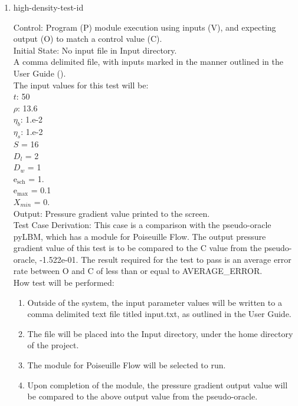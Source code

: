 \documentclass[12pt, titlepage]{article}
\newcounter{testcounter} %
\begin{document}
\begin{enumerate}
\item{high-density-test-id\thetestcounter \\}

Control: Program (P) module execution using inputs (V), and expecting output (O)
to match a control value (C).\\
					
Initial State: No input file in Input directory.\\
					
A comma delimited file, with inputs marked in the manner outlined in the User
Guide (\citet{LBM_UserGuide_PM}).\\The input values for this test will be:\\
$t$: 50\\
$\rho$: 13.6\\
$\eta_b$: 1.e-2\\
$\eta_s$: 1.e-2\\
$S$ = 16\\
$D_{l}$ = 2\\
$D_{w}$ = 1\\
$\mathrm{e_{sch}}$ = 1.\\
$\mathrm{e_{max}}$ = 0.1\\
$X_{min}$ = 0.\\

Output: Pressure gradient value printed to the screen.  \\

Test Case Derivation: This case is a comparison with the pseudo-oracle pyLBM,
which has a module for Poiseuille Flow. The output pressure gradient value of
this test is to be compared to the C value from the pseudo-oracle,
-1.522e-01. The result required for the test to pass is an average error rate
between O and C of less than or equal to AVERAGE\_ERROR.\\

How test will be performed: 

\begin{enumerate}
\item Outside of the system, the input parameter values will be written to a
comma delimited text file titled input.txt, as outlined in the User Guide.
\item The file will be placed into the Input directory, under the home directory
of the project.
\item The module for Poiseuille Flow will be selected to run.
\item Upon completion of the module, the pressure gradient output value will be
compared to the above output value from the pseudo-oracle.
\end{enumerate}	


\end{enumerate}
\end{document}
